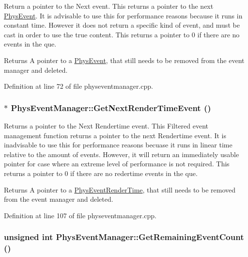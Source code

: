 Return a pointer to the Next event. This returns a pointer to the next \hyperlink{classPhysEvent}{PhysEvent}. It is advisable to use this for performance reasons because it runs in constant time. However it does not return a specific kind of event, and must be cast in order to use the true content. This returns a pointer to 0 if there are no events in the que. \begin{DoxyReturn}{Returns}
A pointer to a \hyperlink{classPhysEvent}{PhysEvent}, that still needs to be removed from the event manager and deleted. 
\end{DoxyReturn}


Definition at line 72 of file physeventmanager.cpp.\hypertarget{classPhysEventManager_a1f2d0506ce816176913e5bdfaa9fd724}{
\subsubsection[{GetNextRenderTimeEvent}]{ $\ast$ PhysEventManager::GetNextRenderTimeEvent ()}}
\label{d5/dd7/classPhysEventManager_a1f2d0506ce816176913e5bdfaa9fd724}


Returns a pointer to the Next Rendertime event. This Filtered event management function returns a pointer to the next Rendertime event. It is inadvisable to use this for performance reasons becuase it runs in linear time relative to the amount of events. However, it will return an immediately usable pointer for case where an extreme level of performance is not required. This returns a pointer to 0 if there are no redertime events in the que. \begin{DoxyReturn}{Returns}
A pointer to a \hyperlink{classPhysEventRenderTime}{PhysEventRenderTime}, that still needs to be removed from the event manager and deleted. 
\end{DoxyReturn}


Definition at line 107 of file physeventmanager.cpp.\hypertarget{classPhysEventManager_ab14d238e7abe9919be8e2d9eef388b64}{
\subsubsection[{GetRemainingEventCount}]{\setlength{\rightskip}{0pt plus 5cm}unsigned int PhysEventManager::GetRemainingEventCount ()}}
\label{d5/dd7/classPhysEventManager_ab14d238e7abe9919be8e2d9eef388b64}


